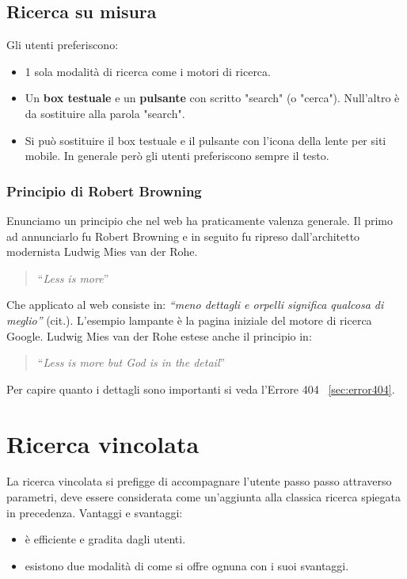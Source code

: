 		\subsection{Ricerca su misura}	
			Gli utenti preferiscono:
			\begin{itemize}
				\item 1 sola modalità di ricerca come i motori di ricerca.
				\item Un \textbf{box testuale} e un \textbf{pulsante} con scritto "search" (o "cerca"). Null'altro è da sostituire alla parola "search".
				\item Si può sostituire il box testuale e il pulsante con l'icona della lente per siti mobile. In generale però gli utenti preferiscono sempre il testo.
			\end{itemize}
	
			\subsubsection{Principio di Robert Browning}
				Enunciamo un principio che nel web ha praticamente valenza generale. Il primo ad annunciarlo fu Robert Browning e in seguito fu ripreso dall'architetto modernista Ludwig Mies van der Rohe.
				\begin{quote}
					``\emph{Less is more}''
				\end{quote}
				Che applicato al web consiste in: \emph{``meno dettagli e orpelli significa qualcosa di meglio''} (cit.). L'esempio lampante è la pagina iniziale del motore di ricerca Google.
				Ludwig Mies van der Rohe estese anche il principio in:
				\begin{quote}
					``\emph{Less is more but God is in the detail}''
				\end{quote} 
				Per capire quanto i dettagli sono importanti si veda l'Errore 404 ~\ref{sec:error404}.
	
	\section{Ricerca vincolata}
		La ricerca vincolata si prefigge di accompagnare l'utente passo passo attraverso parametri, deve essere considerata come un'aggiunta alla classica ricerca spiegata in precedenza. Vantaggi e svantaggi:
		\begin{itemize}
			\item è efficiente e gradita dagli utenti.
			\item esistono due modalità di come si offre ognuna con i suoi svantaggi.
		\end{itemize}
		
